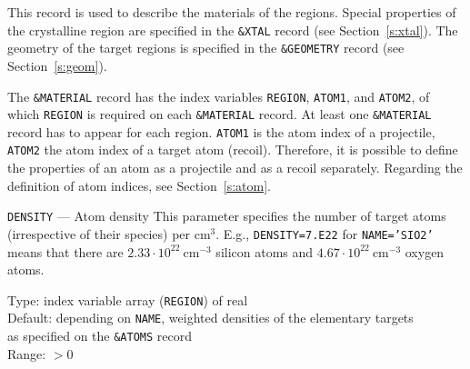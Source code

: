 This record is used to describe the materials of the regions. Special properties
of the crystalline region are specified in the \texttt{\&XTAL} record (see
Section~\ref{s:xtal}). The geometry of the target regions is specified in the
\texttt{\&GEOMETRY} record (see Section~\ref{s:geom}). 

The \texttt{\&MATERIAL}
record has the index variables \texttt{REGION}, \texttt{ATOM1}, and
\texttt{ATOM2}, of which \texttt{REGION} is required on each \texttt{\&MATERIAL}
record.  At least one \texttt{\&MATERIAL} record has to appear for each region.
\texttt{ATOM1} is the atom index of a projectile, \texttt{ATOM2} the atom
index of a target atom (recoil). Therefore, it is possible to define the
properties of an atom as a projectile and as a recoil separately. Regarding the
definition of atom indices, see Section~\ref{s:atom}. 


\begin{keydescription}{\texttt{DENSITY} --- Atom density}
%
  This parameter specifies the number of target atoms (irrespective of
  their species) per cm$^3$. E.g., \texttt{DENSITY=7.E22} for
  \texttt{NAME='SIO2'} means that there are $2.33 \cdot
  10^{22}~\mathrm{cm}^{-3}$ silicon atoms and $4.67 \cdot
  10^{22}~\mathrm{cm}^{-3}$ oxygen atoms. 
  \begin{keytab}
    Type:    \> index variable array (\texttt{REGION}) of real \\
    Default: \> depending on \texttt{NAME}, weighted densities of the 
                elementary targets \\
            \> as specified on the \texttt{\&ATOMS} record \\
    Range:   \> $> 0$
  \end{keytab}
\end{keydescription}

